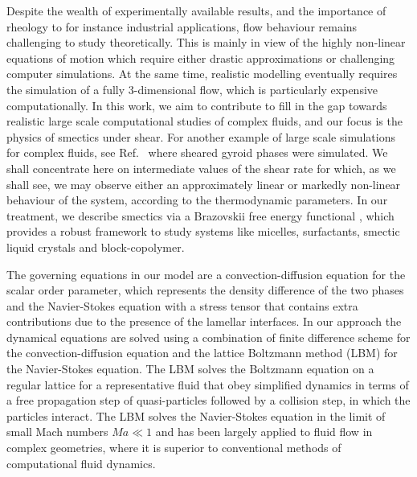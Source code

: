 \documentclass[8.5pt,twoside,twocolumn]{article}
\begin{document}
Despite the wealth of experimentally available results, and the importance of rheology to for instance industrial applications, flow behaviour remains challenging to study theoretically. This is mainly in view of the highly non-linear equations of motion which require either drastic approximations or challenging computer simulations. At the same time, realistic modelling eventually requires the simulation of a fully 3-dimensional flow, which is particularly expensive computationally. In this work, we aim to contribute to fill in the gap towards realistic large scale computational studies of complex fluids, and our focus is the physics of smectics under shear. For another example of large scale simulations for complex fluids, see Ref.~\cite{Saksena09} where sheared gyroid phases were simulated.
We shall concentrate here on intermediate values of the shear rate for which, as we shall see, we may observe either an approximately linear or markedly non-linear behaviour of the system, according to the thermodynamic parameters. In our treatment, we describe smectics via a Brazovskii free energy functional \cite{Brazovskii75}, which provides a robust framework to study systems like micelles, surfactants, smectic liquid crystals and block-copolymer.


The governing equations in our model are a convection-diffusion equation for the scalar order parameter, which represents the density difference of the two phases and the Navier-Stokes equation with a stress tensor that contains extra contributions due to the presence of the lamellar interfaces.
In our approach the dynamical equations are solved using a combination of finite difference scheme for the convection-diffusion equation and the lattice Boltzmann method (LBM) \cite{Succi} for the Navier-Stokes equation.
The LBM solves the Boltzmann equation on a regular lattice for a representative fluid that obey simplified dynamics in terms of a free propagation step of quasi-particles followed by a collision step, in which the particles interact.
The LBM solves the Navier-Stokes equation in the limit of small Mach numbers $Ma\ll1$ and has been largely applied to fluid flow in complex geometries, where it is superior to conventional methods of computational fluid dynamics.
\end{document}

